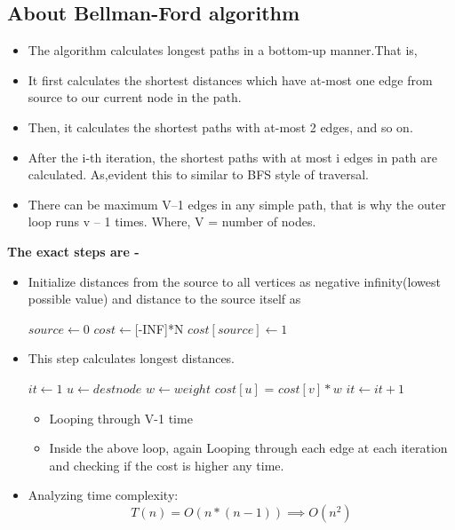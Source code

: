 \documentclass[journal,12pt,twocolumn]{IEEEtran}
\begin{document}
\subsection{\textbf{About Bellman-Ford algorithm}}
\begin{itemize}

 \item The algorithm calculates longest paths in a bottom-up manner.That is,
 \item It first calculates the shortest distances which have at-most one edge from source to our current node in the path.
 \item Then, it calculates the shortest paths with at-most 2 edges, and so on. \item After the i-th iteration, the shortest paths with at most i edges in path are calculated. As,evident this to similar to BFS style of traversal.
 \item There can be maximum V–1 edges in any simple path, that is why the outer loop runs v – 1 times. Where, V = number of nodes.
\end{itemize}
\textbf{The exact steps are - }
\begin{itemize}
\item Initialize distances from the source to all vertices as negative infinity(lowest possible value) and distance to the source itself as
\begin{algorithm}
\begin{algorithmic}
\State $source \gets 0$
\State $cost \gets $[-INF]*N
\State $cost[source] \gets 1$
\end{algorithmic}
\end{algorithm}
\item This step calculates longest distances.\\

\begin{algorithm}
\begin{algorithmic}
    \State $it \gets 1$
    \State $u \gets dest node$
    \State $w \gets weight$
    \State $cost[u]$ = $cost[v]*w$
    \EndIf
    \EndFor
    \State $it \gets it+1$
    \EndWhile
\end{algorithmic}
\end{algorithm}
\begin{itemize}


\item Looping through V-1 time \\
\item Inside the above loop, again Looping through each edge at each iteration and checking if the cost is higher any time.

\end{itemize}

\item Analyzing time complexity:\\
\begin{equation}
        T(n)  = O(n*(n-1)) \label{eq:runtime_eff}
        \implies O(n^{2})
\end{equation}

\end{itemize}
\end{document}
